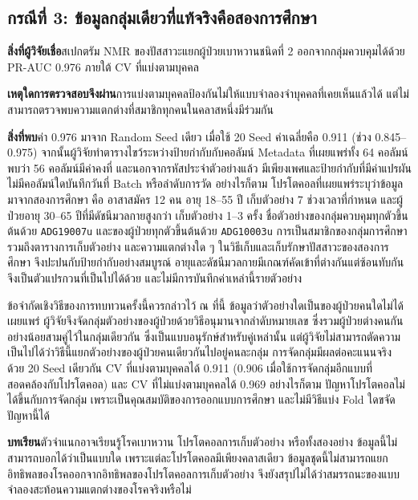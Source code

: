 \documentclass[11pt,a4paper]{article}
\newcommand{\storylabel}[1]{\textbf{#1}\quad}
\begin{document}
\subsection{กรณีที่ 3: ข้อมูลกลุ่มเดียวที่แท้จริงคือสองการศึกษา}
\label{sec:case3}

\storylabel{สิ่งที่ผู้วิจัยเชื่อ}สเปกตรัม NMR ของปัสสาวะแยกผู้ป่วยเบาหวานชนิดที่ 2
ออกจากกลุ่มควบคุมได้ด้วย PR-AUC 0.976 ภายใต้ CV ที่แบ่งตามบุคคล

\storylabel{เหตุใดการตรวจสอบจึงผ่าน}การแบ่งตามบุคคลป้องกันไม่ให้แบบจำลองจำบุคคลที่เคยเห็นแล้วได้
แต่ไม่สามารถตรวจพบความแตกต่างที่สมาชิกทุกคนในคลาสหนึ่งมีร่วมกัน

\storylabel{สิ่งที่พบ}ค่า 0.976 มาจาก Random Seed เดียว
เมื่อใช้ 20 Seed ค่าเฉลี่ยคือ 0.911 (ช่วง 0.845--0.975)
จากนั้นผู้วิจัยทำตารางไขว้ระหว่างป้ายกำกับกับคอลัมน์ Metadata ที่เผยแพร่ทั้ง 64 คอลัมน์
พบว่า 56 คอลัมน์มีค่าคงที่ และนอกจากรหัสประจำตัวอย่างแล้ว
มีเพียงเพศและป้ายกำกับที่มีค่าแปรผัน ไม่มีคอลัมน์ใดบันทึกวันที่ Batch หรือลำดับการวัด
อย่างไรก็ตาม โปรโตคอลที่เผยแพร่ระบุว่าข้อมูลมาจากสองการศึกษา
คือ อาสาสมัคร 12 คน อายุ 18--55 ปี เก็บตัวอย่าง 7 ช่วงเวลาที่กำหนด
และผู้ป่วยอายุ 30--65 ปีที่มีดัชนีมวลกายสูงกว่า เก็บตัวอย่าง 1--3 ครั้ง
ชื่อตัวอย่างของกลุ่มควบคุมทุกตัวขึ้นต้นด้วย \texttt{ADG19007u}
และของผู้ป่วยทุกตัวขึ้นต้นด้วย \texttt{ADG10003u}
การเป็นสมาชิกของกลุ่มการศึกษา รวมถึงตารางการเก็บตัวอย่าง
และความแตกต่างใด ๆ ในวิธีเก็บและเก็บรักษาปัสสาวะของสองการศึกษา
จึงปะปนกับป้ายกำกับอย่างสมบูรณ์ อายุและดัชนีมวลกายมีเกณฑ์คัดเข้าที่ต่างกันแต่ซ้อนทับกัน
จึงเป็นตัวแปรกวนที่เป็นไปได้ด้วย และไม่มีการบันทึกค่าเหล่านี้รายตัวอย่าง

ข้อจำกัดเชิงวิธีของการทบทวนครั้งนี้ควรกล่าวไว้ ณ ที่นี้
ข้อมูลว่าตัวอย่างใดเป็นของผู้ป่วยคนใดไม่ได้เผยแพร่
ผู้วิจัยจึงจัดกลุ่มตัวอย่างของผู้ป่วยด้วยวิธีอนุมานจากลำดับหมายเลข
ซึ่งรวมผู้ป่วยต่างคนกันอย่างน้อยสามคู่ไว้ในกลุ่มเดียวกัน
ซึ่งเป็นแบบอนุรักษ์สำหรับคู่เหล่านั้น
แต่ผู้วิจัยไม่สามารถตัดความเป็นไปได้ว่าวิธีนี้แยกตัวอย่างของผู้ป่วยคนเดียวกันไปอยู่คนละกลุ่ม
การจัดกลุ่มมีผลต่อคะแนนจริง ด้วย 20 Seed เดียวกัน CV ที่แบ่งตามบุคคลได้ 0.911
(0.906 เมื่อใช้การจัดกลุ่มอีกแบบที่สอดคล้องกับโปรโตคอล)
และ CV ที่ไม่แบ่งตามบุคคลได้ 0.969 อย่างไรก็ตาม ปัญหาโปรโตคอลไม่ได้ขึ้นกับการจัดกลุ่ม
เพราะเป็นคุณสมบัติของการออกแบบการศึกษา และไม่มีวิธีแบ่ง Fold ใดขจัดปัญหานี้ได้

\storylabel{บทเรียน}ตัวจำแนกอาจเรียนรู้โรคเบาหวาน โปรโตคอลการเก็บตัวอย่าง หรือทั้งสองอย่าง
ข้อมูลนี้ไม่สามารถบอกได้ว่าเป็นแบบใด เพราะแต่ละโปรโตคอลมีเพียงคลาสเดียว \cite{leek2010}
ข้อมูลชุดนี้ไม่สามารถแยกอิทธิพลของโรคออกจากอิทธิพลของโปรโตคอลการเก็บตัวอย่าง
จึงยังสรุปไม่ได้ว่าสมรรถนะของแบบจำลองสะท้อนความแตกต่างของโรคจริงหรือไม่
\end{document}
